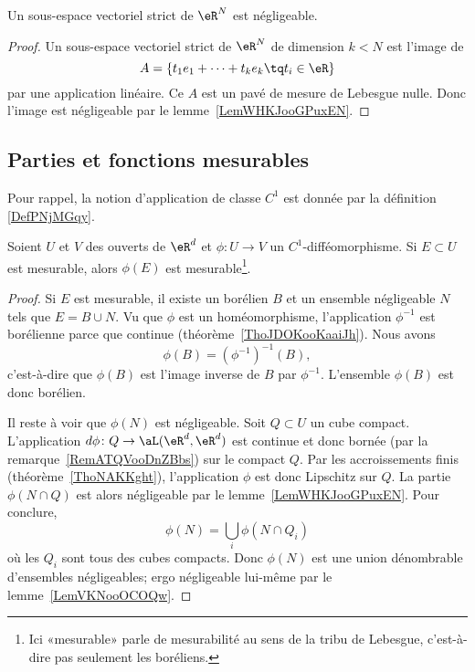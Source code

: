\begin{corollary}
	Un sous-espace vectoriel strict de \( \eR^N\) est négligeable.
\end{corollary}

\begin{proof}
	Un sous-espace vectoriel strict de \( \eR^N\) de dimension \( k<N\) est l'image de
	\begin{equation}
		A=\{ t_1e_1+\cdots +t_ke_k\tq t_i\in \eR \}
	\end{equation}
	par une application linéaire. Ce \( A\) est un pavé de mesure de Lebesgue nulle. Donc l'image est négligeable par le lemme~\ref{LemWHKJooGPuxEN}.
\end{proof}

\subsection{Parties et fonctions mesurables}

Pour rappel, la notion d'application de classe \( C^1\) est donnée par la définition \ref{DefPNjMGqy}.

\begin{proposition}     \label{PropRDRNooFnZSKt}
	Soient \( U\) et \( V\) des ouverts de \( \eR^d\) et \( \phi\colon U\to V\) un \( C^1\)-difféomorphisme. Si \( E\subset U\) est mesurable, alors \( \phi(E)\) est mesurable\footnote{Ici «mesurable» parle de mesurabilité au sens de la tribu de Lebesgue, c'est-à-dire pas seulement les boréliens.}.
\end{proposition}

\begin{proof}
	Si \( E\) est mesurable, il existe un borélien \( B\) et un ensemble négligeable \( N\) tels que \( E=B\cup N\). Vu que \( \phi\) est un homéomorphisme, l'application \( \phi^{-1}\) est borélienne parce que continue (théorème~\ref{ThoJDOKooKaaiJh}). Nous avons
	\begin{equation}
		\phi(B)=(\phi^{-1})^{-1}(B),
	\end{equation}
	c'est-à-dire que \( \phi(B)\) est l'image inverse de \( B\) par \( \phi^{-1}\). L'ensemble \( \phi(B)\) est donc borélien.

	Il reste à voir que \( \phi(N)\) est négligeable. Soit \( Q\subset U\) un cube compact. L'application \( d\phi\colon Q\to \aL(\eR^d,\eR^d)\) est continue et donc bornée (par la remarque~\ref{RemATQVooDnZBbs}) sur le compact \( Q\). Par les accroissements finis (théorème~\ref{ThoNAKKght}), l'application \( \phi\) est donc Lipschitz sur \( Q\). La partie \( \phi(N\cap Q)\) est alors négligeable par le lemme~\ref{LemWHKJooGPuxEN}. Pour conclure,
	\begin{equation}
		\phi(N)=\bigcup_i\phi(N\cap Q_i)
	\end{equation}
	où les \( Q_i\) sont tous des cubes compacts. Donc \( \phi(N)\) est une union dénombrable d'ensembles négligeables; ergo négligeable lui-même par le lemme~\ref{LemVKNooOCOQw}.
\end{proof}

